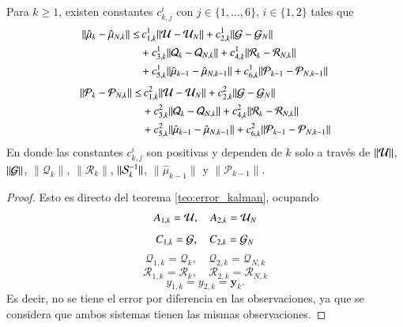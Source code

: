 \begin{prop}
	Para $k \geq 1$, existen constantes $c_{k,j}^i$ con $j \in \{ 1, \dots, 6\}$, $i \in \{ 1, 2\}$ tales que
	\begin{equation*}
		\begin{aligned}
			\| \hat \mu_{k} - \hat \mu_{N,k}  \| \leq & \, c_{1,k}^1 \| \U - \U_N \| +  c_{2,k}^1 \| \G - \G_N \| \\ 
			&+ c_{3,k}^1 \| \mathcal{Q}_{k} - \mathcal{Q}_{N, k} \| +c_{4,k}^1 \| \mathcal{R}_{k} - \mathcal{R}_{N, k} \| \\
			& + c_{5,k}^1 \| \hat \mu_{k-1} - \hat \mu_{N, k-1} \| + c_{6,k}^1 \| \mathcal{P}_{k-1} - \mathcal{P}_{N, k-1} \|
		\end{aligned}
		\label{}
	\end{equation*}
	\begin{equation*}
		\begin{aligned}
			\| \mathcal{P}_{k} - \mathcal{P}_{N,k} \| \leq & \, c_{1,k}^2 \| \U - \U_N \| +  c_{2,k}^2 \| \G - \G_N \| \\ 
			&+ c_{3,k}^2 \| \mathcal{Q}_{k} - \mathcal{Q}_{N, k} \| +c_{4,k}^2 \| \mathcal{R}_{k} - \mathcal{R}_{N, k} \| \\
			& + c_{5,k}^2 \| \hat \mu_{k-1} - \hat \mu_{N, k-1} \| + c_{6,k}^2 \| \mathcal{P}_{k-1} - \mathcal{P}_{N, k-1} \|
		\end{aligned}
	\end{equation*}
	En donde las constantes $c_{k,j}^i$ son positivas y dependen de $k$ solo a través de $\| \U \| $, $\| \G \| $, $\| \mathcal{Q}_{k} \| $, $\| \mathcal{R}_{k} \| $, $\| \S_{k}^{-1} \| $, $\| \hat{\mu}_{k-1} \| $ y $\| \mathcal{P}_{k-1} \| $.
	\label{prop:err_kerKKF_1}
\end{prop}

\begin{proof}
    Esto es directo del teorema \ref{teo:error_kalman}, ocupando
    \begin{equation*}
        A_{1,k} = \U, \quad A_{2,k} = \U_N 
    \end{equation*}
    \begin{equation*}
        C_{1,k} = \G, \quad C_{2,k} = \G_N 
    \end{equation*}
    \begin{equation*}
        \mathcal{Q}_{1,k} = \mathcal{Q}_k, \quad \mathcal{Q}_{2,k} = \mathcal{Q}_{N, k}
    \end{equation*}
    \begin{equation*}
        \mathcal{R}_{1,k} = \mathcal{R}_k, \quad \mathcal{R}_{2,k} = \mathcal{R}_{N, k}
    \end{equation*}
    \begin{equation*}
        y_{1, k} = y_{2, k} = \mathbf{y}_k.
    \end{equation*}
    Es decir, no se tiene el error por diferencia en las observaciones, ya que se considera que ambos sistemas tienen las mismas observaciones.
\end{proof}

